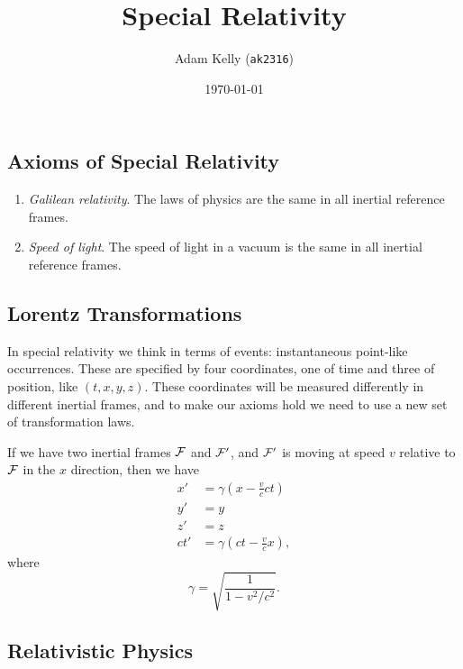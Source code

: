 \documentclass{scrartcl}
\title{Special Relativity}
\author{Adam Kelly (\texttt{ak2316})}
\date{\today}
\theoremstyle{definition}
\begin{document}
\maketitle  


\subsection*{Axioms of Special Relativity}

\begin{enumerate}
	\item \emph{Galilean relativity}. The laws of physics are the same in all inertial reference frames.
	\item \emph{Speed of light}. The speed of light in a vacuum is the same in all inertial reference frames.
\end{enumerate}


\subsection*{Lorentz Transformations}

In special relativity we think in terms of events: instantaneous point-like occurrences. These are specified by four coordinates, one of time and three of position, like $(t, x, y, z)$.
These coordinates will be measured differently in different inertial frames, and to make our axioms hold we need to use a new set of transformation laws.

If we have two inertial frames $\mathcal{F}$ and $\mathcal{F}'$, and $\mathcal{F}'$ is moving at speed $v$ relative to $\mathcal{F}$ in the $x$ direction, then we have
\begin{align*}
	x' &= \gamma \left(x - \frac{v}{c} ct\right) \\
	y' &= y \\
	z' &= z \\
	ct' &= \gamma\left(ct - \frac{v}{c}x\right),
\end{align*}  
where
$$
\gamma = \sqrt{\frac{1}{1 - v^2/c^2}}.
$$


\subsection*{Relativistic Physics}
\end{document}
